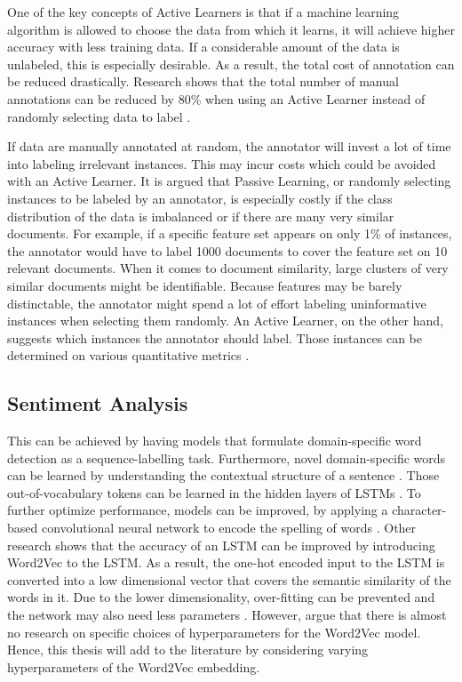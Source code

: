 \documentclass[11pt, a4paper]{article}
\begin{document}
One of the key concepts of Active Learners is that if a machine learning algorithm is allowed to choose the data from which it learns, 
it will achieve higher accuracy with less training data. If a considerable amount of the data is unlabeled, this is especially desirable. 
As a result, the total cost of annotation can be reduced drastically. Research shows that the total number of 
manual annotations can be reduced by 80\% when using an Active Learner instead of randomly 
selecting data to label \citep{baldridgeosborne2004active}.

If data are manually annotated at random, the annotator will invest a lot of time into labeling irrelevant instances. 
This may incur costs which could be avoided with an Active Learner. It is argued that Passive Learning, or randomly selecting instances 
to be labeled by an annotator, is especially costly if the class distribution of the data is imbalanced or if there are many very similar documents. 
For example, if a specific feature set appears on only 1\% of instances, the annotator would have to label 1000 documents to cover 
the feature set on 10 relevant documents. When it comes to document similarity, large clusters of very similar documents might be 
identifiable. Because features may be barely distinctable, the annotator might spend a lot of effort labeling uninformative instances 
when selecting them randomly. An Active Learner, on the other hand, suggests which instances the annotator should label. Those instances can be 
determined on various quantitative metrics \citep{miller2020activelearningapproaches}.

\subsection{Sentiment Analysis}
This can be achieved by having models that formulate domain-specific word detection as a 
sequence-labelling task. Furthermore, novel domain-specific words can be learned by understanding the contextual 
structure of a sentence \citep{pei2019slang}. Those out-of-vocabulary tokens can be learned in the hidden layers of 
LSTMs \citep{hochreiter1997lstm}. To further optimize performance, models can be improved, by applying a character-based 
convolutional neural network to encode the spelling of words \citep{pei2019slang}. Other research shows that the accuracy of an
LSTM can be improved by introducing Word2Vec to the LSTM. As a result, the one-hot encoded input to the LSTM is
converted into a low dimensional vector that covers the semantic similarity of the words in it. Due to the lower dimensionality,
over-fitting can be prevented and the network may also need less parameters \citep{xiao2018word2veclstm}. However, \cite{giovanni2021word2vec}
argue that there is almost no research on specific choices of hyperparameters for the Word2Vec model. Hence, this thesis will add to the literature
by considering varying hyperparameters of the Word2Vec embedding.
\end{document}
